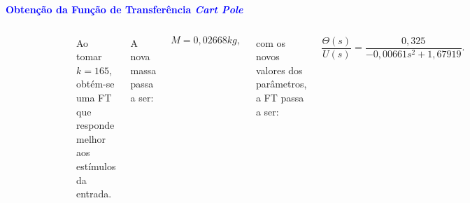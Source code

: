 \documentclass[aspectratio=169]{beamer}
\begin{document}

\begin{frame}{\textcolor{blue}{\textbf{Obtenção da Função de Transferência \textit{Cart Pole}}}}
\begin{columns}
\vspace{-.55cm}

\begin{figure}[H]
\vspace{-.5cm}
     \centering
     \includegraphics[scale=.475]{images/RMSE1.png}
     \label{fcte}
\end{figure}
\vspace{-.85cm}
\justifying Ao tomar $k=165$, obtém-se uma FT que responde melhor aos estímulos da entrada.

\vspace{-.75cm}

A nova massa passa a ser:

\begin{equation}
    M = 0,02668 kg,
    \label{eq:MV}
\end{equation}

\noindent \justifying com os novos valores dos parâmetros, a FT passa a ser:

\begin{equation}
     \frac{\Theta (s)}{U(s)} = \frac{0,325}{-0,00661s^2 +  1,67919}.
    \label{eq:31}
\end{equation}


\begin{figure}[H]
\centering
\vspace*{-.475cm}
\label{blocos}
\end{figure}


\end{columns}
\end{frame}
\end{document}
